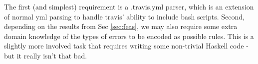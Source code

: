 \documentclass{sigplanconf}
\begin{document}
The first (and simplest) requirement is a .travis.yml parser, which is an extension of normal yml parsing to handle travis' ability to include bash scripts.
Second, depending on the results from Sec \ref{sec:feas}, we may also require some extra domain knowledge of the types of errors to be encoded as possible rules.
This is a slightly more involved task that requires writing some non-trivial Haskell code - but it really isn't that bad.






\end{document}
